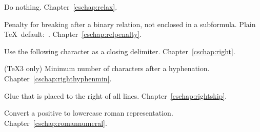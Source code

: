 \begin{glossinventory}
\item [\cs{relax}]
      Do nothing.
Chapter~\ref{cschap:relax}.

\item [\cs{relpenalty}]
      Penalty for breaking after a binary relation, not enclosed
      in a subformula.
      Plain \TeX\ default:~.
Chapter~\ref{cschap:relpenalty}.

\item [\cs{right}]
      Use the following character as a closing delimiter.
Chapter~\ref{cschap:right}.

\item [\cs{righthyphenmin}]
      (\TeX3 only) 
      Minimum number of characters after a hyphenation.
Chapter~\ref{cschap:righthyphenmin}.

\item [\cs{rightskip}]
      Glue that is placed to the right of all lines.
Chapter~\ref{cschap:rightskip}.

\item [\cs{romannumeral\gr{number}}]
      Convert a positive
       to lowercase roman representation.
Chapter~\ref{cschap:romannumeral}.


\end{glossinventory}
